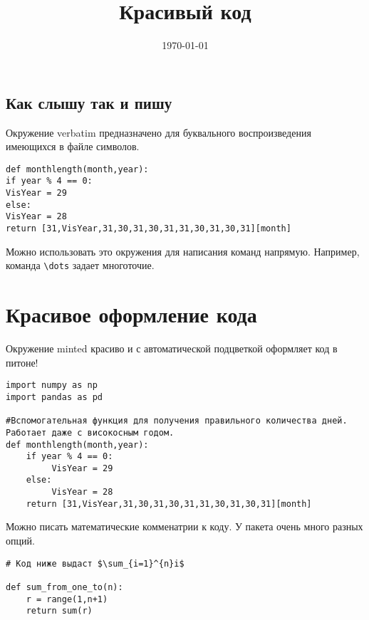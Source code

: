\documentclass[12pt, a4paper]{article}
\title{Красивый код}
\date{\today}
\begin{document}

\maketitle


\subsection{Как слышу так и пишу}

Окружение verbatim предназначено для буквального воспроизведения имеющихся в файле символов.

\begin{verbatim}
def monthlength(month,year):
if year % 4 == 0:
VisYear = 29
else:
VisYear = 28
return [31,VisYear,31,30,31,30,31,31,30,31,30,31][month]
\end{verbatim}

Можно использовать это окружения для написания команд напрямую. Например, команда \verb|\dots| задает многоточие.


\section{Красивое оформление кода}

Окружение minted красиво и с автоматической подцветкой оформляет код в питоне!

\begin{verbatim}
import numpy as np
import pandas as pd

#Вспомогательная функция для получения правильного количества дней. Работает даже с високосным годом.
def monthlength(month,year):
    if year % 4 == 0:
         VisYear = 29
    else:
         VisYear = 28
    return [31,VisYear,31,30,31,30,31,31,30,31,30,31][month]
\end{verbatim}

Можно писать математические комменатрии к коду. У пакета очень много разных опций.

\begin{verbatim}
# Код ниже выдаст $\sum_{i=1}^{n}i$

def sum_from_one_to(n):
    r = range(1,n+1)
    return sum(r)
\end{verbatim}
\end{document}
